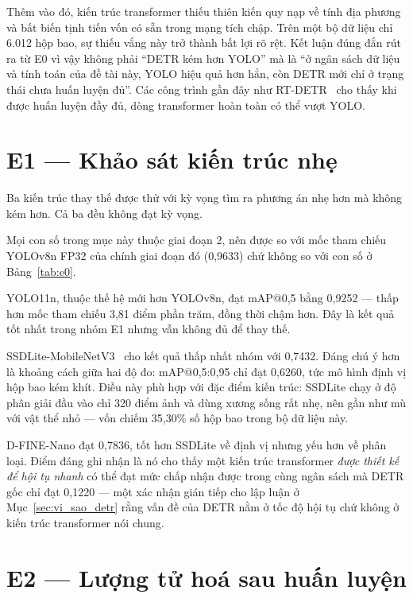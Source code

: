 Thêm vào đó, kiến trúc transformer thiếu thiên kiến quy nạp về tính địa phương và bất biến tịnh
tiến vốn có sẵn trong mạng tích chập. Trên một bộ dữ liệu chỉ 6.012 hộp bao, sự thiếu vắng này trở
thành bất lợi rõ rệt. Kết luận đúng đắn rút ra từ E0 vì vậy không phải ``DETR kém hơn YOLO'' mà là
``ở ngân sách dữ liệu và tính toán của đề tài này, YOLO hiệu quả hơn hẳn, còn DETR mới chỉ ở trạng
thái chưa huấn luyện đủ''. Các công trình gần đây như RT-DETR~\cite{zhao2024rtdetr} cho thấy khi
được huấn luyện đầy đủ, dòng transformer hoàn toàn có thể vượt YOLO.

\section{E1 --- Khảo sát kiến trúc nhẹ}

Ba kiến trúc thay thế được thử với kỳ vọng tìm ra phương án nhẹ hơn mà không kém hơn. Cả ba đều
không đạt kỳ vọng.

Mọi con số trong mục này thuộc giai đoạn 2, nên được so với mốc tham chiếu YOLOv8n FP32 của chính
giai đoạn đó (0,9633) chứ không so với con số ở Bảng~\ref{tab:e0}.

YOLO11n, thuộc thế hệ mới hơn YOLOv8n, đạt mAP@0,5 bằng 0,9252 --- thấp hơn mốc tham chiếu 3,81
điểm phần trăm, đồng thời chậm hơn. Đây là kết quả tốt nhất trong nhóm E1 nhưng vẫn không đủ để
thay thế.

SSDLite-MobileNetV3~\cite{liu2016ssd,howard2019mobilenetv3} cho kết quả thấp nhất nhóm với 0,7432.
Đáng chú ý hơn là khoảng cách giữa hai độ đo: mAP@0,5:0,95 chỉ đạt 0,6260, tức mô hình định vị hộp
bao kém khít. Điều này phù hợp với đặc điểm kiến trúc: SSDLite chạy ở độ phân giải đầu vào chỉ 320
điểm ảnh và dùng xương sống rất nhẹ, nên gần như mù với vật thể nhỏ --- vốn chiếm 35,30\% số hộp
bao trong bộ dữ liệu này.

D-FINE-Nano đạt 0,7836, tốt hơn SSDLite về định vị nhưng yếu hơn về phân loại. Điểm đáng ghi nhận
là nó cho thấy một kiến trúc transformer \emph{được thiết kế để hội tụ nhanh} có thể đạt mức chấp
nhận được trong cùng ngân sách mà DETR gốc chỉ đạt 0,1220 --- một xác nhận gián tiếp cho lập luận
ở Mục~\ref{sec:vi_sao_detr} rằng vấn đề của DETR nằm ở tốc độ hội tụ chứ không ở kiến trúc
transformer nói chung.

\section{E2 --- Lượng tử hoá sau huấn luyện}

